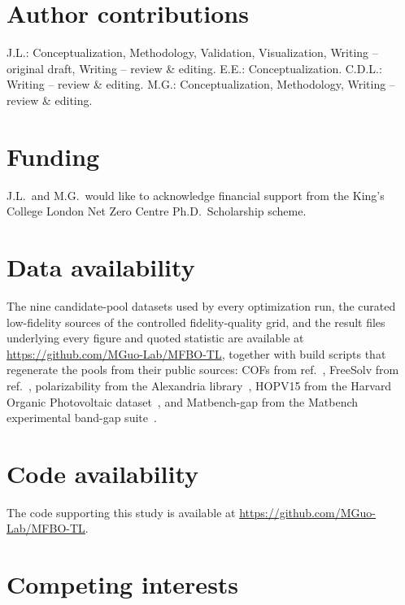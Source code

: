 \documentclass[11pt,a4paper]{article}%
\begin{document}
\section*{Author contributions}

J.L.: Conceptualization, Methodology, Validation, Visualization,
Writing -- original draft, Writing -- review \& editing.
E.E.: Conceptualization.
C.D.L.: Writing -- review \& editing.
M.G.: Conceptualization, Methodology, Writing -- review \& editing.

\section*{Funding}

J.L.\ and M.G.\ would like to acknowledge financial support from the King's
College London Net Zero Centre Ph.D.\ Scholarship scheme.

\section*{Data availability}

The nine candidate-pool datasets used by every optimization run, the curated
low-fidelity sources of the controlled fidelity-quality grid, and the result
files underlying every figure and quoted statistic are available at
\url{https://github.com/MGuo-Lab/MFBO-TL}, together with build scripts
that regenerate the pools from their public sources: COFs from
ref.~\citep{gantzler2023multifidelity}, FreeSolv from
ref.~\citep{mobley2014freesolv}, polarizability from the Alexandria
library~\citep{ghahremanpour2018alexandria}, HOPV15 from the Harvard Organic
Photovoltaic dataset~\citep{lopez2016harvard}, and Matbench-gap from the Matbench
experimental band-gap suite~\citep{dunn2020benchmarking}.

\section*{Code availability}

The code supporting this study is available at
\url{https://github.com/MGuo-Lab/MFBO-TL}.

\section*{Competing interests}
\end{document}

